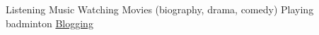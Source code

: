 {\enskip\cdotp\enskip}  Listening Music {\enskip\cdotp\enskip} Watching Movies (biography, drama, comedy) {\enskip\cdotp\enskip} Playing badminton \href{https://relatetechno.blogspot.com/}{{\enskip\cdotp\enskip} Blogging}
\vspace{-3mm}

